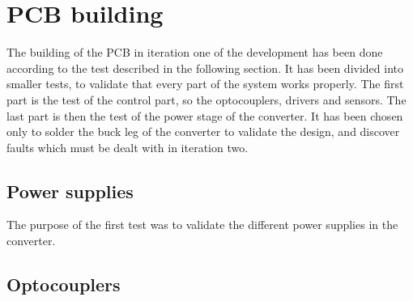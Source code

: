\section{PCB building} \label{sec:pcb_building}
The building of the PCB in iteration one of the development has been done according to the test described in the following section. It has been divided into smaller tests, to validate that every part of the system works properly. The first part is the test of the control part, so the optocouplers, drivers and sensors. The last part is then the test of the power stage of the converter. It has been chosen only to solder the buck leg of the converter to validate the design, and discover faults which must be dealt with in iteration two.

\subsection{Power supplies} \label{sec:test_pwr_sup}
The purpose of the first test was to validate the different power supplies in the converter. 

\subsection{Optocouplers} \label{sec:test_opto}

